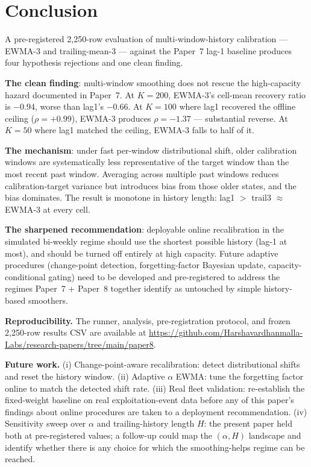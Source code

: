 \section{Conclusion}
\label{sec:conclusion}

A pre-registered 2{,}250-row evaluation of multi-window-history
calibration --- EWMA-3 and trailing-mean-3 --- against the Paper~7
lag-1 baseline produces four hypothesis rejections and one clean
finding.

\textbf{The clean finding}: multi-window smoothing does not rescue
the high-capacity hazard documented in Paper~7. At $K = 200$, EWMA-3's
cell-mean recovery ratio is $-0.94$, worse than \textsf{lag1}'s
$-0.66$. At $K = 100$ where \textsf{lag1} recovered the offline
ceiling ($\rho = +0.99$), EWMA-3 produces $\rho = -1.37$ ---
substantial reverse. At $K = 50$ where \textsf{lag1} matched the
ceiling, EWMA-3 falls to half of it.

\textbf{The mechanism}: under fast per-window distributional shift,
older calibration windows are systematically less representative of
the target window than the most recent past window. Averaging across
multiple past windows reduces calibration-target variance but
introduces bias from those older states, and the bias dominates.
The result is monotone in history length: \textsf{lag1} $>$
\textsf{trail3} $\approx$ EWMA-3 at every cell.

\textbf{The sharpened recommendation}: deployable online
recalibration in the simulated bi-weekly regime should use the
shortest possible history (lag-1 at most), and should be turned off
entirely at high capacity. Future adaptive procedures
(change-point detection, forgetting-factor Bayesian update,
capacity-conditional gating) need to be developed and
pre-registered to address the regimes Paper~7 + Paper~8 together
identify as untouched by simple history-based smoothers.

\textbf{Reproducibility.} The runner, analysis, pre-registration
protocol, and frozen 2{,}250-row results CSV are available at
\url{https://github.com/Harshavardhanmalla-Labs/research-papers/tree/main/paper8}.

\textbf{Future work.} (i) Change-point-aware recalibration: detect
distributional shifts and reset the history window. (ii) Adaptive
$\alpha$ EWMA: tune the forgetting factor online to match the
detected shift rate. (iii) Real fleet validation: re-establish the
fixed-weight baseline on real exploitation-event data before any of
this paper's findings about online procedures are taken to a
deployment recommendation. (iv) Sensitivity sweep over $\alpha$ and
trailing-history length $H$: the present paper held both at
pre-registered values; a follow-up could map the $(\alpha, H)$
landscape and identify whether there is any choice for which the
smoothing-helps regime can be reached.
